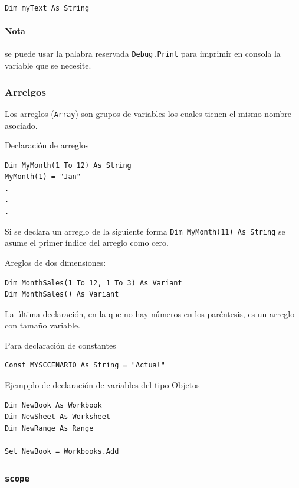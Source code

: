 \begin{verbatim}
Dim myText As String
\end{verbatim}


\paragraph{Nota} se puede usar la palabra reservada \texttt{Debug.Print} para imprimir en consola la variable que se necesite.

\subsubsection{Arrelgos}

Los arreglos (\texttt{Array}) son grupos de variables los cuales tienen el mismo nombre asociado.


Declaración de arreglos

\begin{verbatim}
Dim MyMonth(1 To 12) As String
MyMonth(1) = "Jan"
.
.
.
\end{verbatim}

Si se declara un arreglo de la siguiente forma \texttt{Dim MyMonth(11) As String} se asume el primer índice del arreglo como cero.

Areglos de dos dimensiones:

\begin{verbatim}
Dim MonthSales(1 To 12, 1 To 3) As Variant
Dim MonthSales() As Variant
\end{verbatim}

La última declaración, en la que no hay números en los paréntesis, es un arreglo con tamaño variable.

Para declaración de constantes

\begin{verbatim}
Const MYSCCENARIO As String = "Actual"
\end{verbatim}


Ejempplo de declaración de variables del tipo Objetos


\begin{verbatim}
Dim NewBook As Workbook
Dim NewSheet As Worksheet
Dim NewRange As Range

Set NewBook = Workbooks.Add
\end{verbatim}

\subsubsection{\texttt{scope}}

